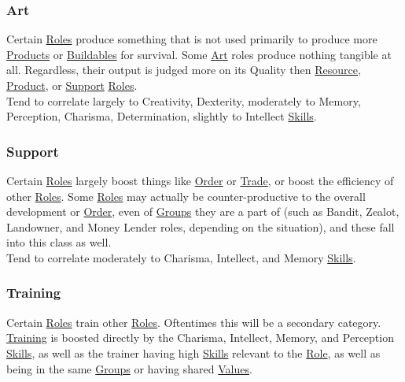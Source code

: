 \documentclass[11pt]{article}
\begin{document}
\subsubsection{Art \label{org549cdbd} \label{orgcb02d08}}
\label{sec:orgaeb9ff9}
Certain \hyperref[org080bb13]{Roles} produce something that is not used primarily to produce more \hyperref[orgc5e54a9]{Products} or \hyperref[orgb7b8c78]{Buildables} for survival. Some \hyperref[org978f042]{Art} roles produce nothing tangible at all. Regardless, their output is judged more on its Quality then \hyperref[org20641a7]{Resource}, \hyperref[org5730b6c]{Product}, or \hyperref[orgacd3f90]{Support} \hyperref[org080bb13]{Roles}.\\

Tend to correlate largely to Creativity, Dexterity, moderately to Memory, Perception, Charisma, Determination, slightly to Intellect \hyperref[org58ad070]{Skills}.\\
\subsubsection{Support \label{orgacd3f90} \label{orgc23aaca}}
\label{sec:org08b3024}
Certain \hyperref[org080bb13]{Roles} largely boost things like \hyperref[orgd146db7]{Order} or \hyperref[orgdbeaa2d]{Trade}, or boost the efficiency of other \hyperref[org080bb13]{Roles}. Some \hyperref[org080bb13]{Roles} may actually be counter-productive to the overall development or \hyperref[orgd146db7]{Order}, even of \hyperref[org21e4d88]{Groups} they are a part of (such as Bandit, Zealot, Landowner, and Money Lender roles, depending on the situation), and these fall into this class as well.\\

Tend to correlate moderately to Charisma, Intellect, and Memory \hyperref[org58ad070]{Skills}.\\
\subsubsection{Training \label{orgc2dca89} \label{org307a9c7}}
\label{sec:orge66d962}
Certain \hyperref[org080bb13]{Roles} train other \hyperref[org080bb13]{Roles}. Oftentimes this will be a secondary category.\\

\hyperref[orgc2dca89]{Training} is boosted directly by the Charisma, Intellect, Memory, and Perception \hyperref[org58ad070]{Skills}, as well as the trainer having high \hyperref[org58ad070]{Skills} relevant to the \hyperref[orgada42dd]{Role}, as well as being in the same \hyperref[org21e4d88]{Groups} or having shared \hyperref[orge4a3133]{Values}.\\
\end{document}
